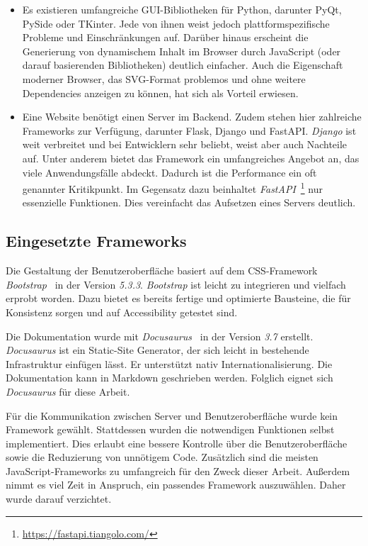 \begin{itemize}
    \item Es existieren umfangreiche GUI-Bibliotheken für Python, darunter PyQt, PySide oder TKinter. Jede von ihnen weist jedoch plattformspezifische Probleme und Einschränkungen auf.
    Darüber hinaus erscheint die Generierung von dynamischem Inhalt im Browser durch JavaScript (oder darauf basierenden Bibliotheken) deutlich einfacher. Auch die Eigenschaft moderner Browser,
    das SVG-Format problemos und ohne weitere Dependencies anzeigen zu können, hat sich als Vorteil erwiesen.
    \item Eine Website benötigt einen Server im Backend. Zudem stehen hier zahlreiche Frameworks zur Verfügung, darunter Flask, Django und FastAPI.
    \textit{Django} ist weit verbreitet und bei Entwicklern sehr beliebt, weist aber auch Nachteile auf. Unter anderem bietet das Framework ein umfangreiches Angebot an, das viele Anwendungsfälle abdeckt.
    Dadurch ist die Performance ein oft genannter Kritikpunkt. 
    Im Gegensatz dazu beinhaltet \textit{FastAPI}~\footnote{\hspace{1.5mm}\url{https://fastapi.tiangolo.com/}} nur essenzielle Funktionen. Dies vereinfacht das Aufsetzen eines Servers deutlich.
\end{itemize}

\subsection{Eingesetzte Frameworks}

Die Gestaltung der Benutzeroberfläche basiert auf dem CSS-Framework \textit{Bootstrap}~\cite{bootstrap} in der Version \textit{5.3.3}.
\textit{Bootstrap} ist leicht zu integrieren und vielfach erprobt worden. Dazu bietet es bereits fertige und optimierte Bausteine, die für Konsistenz sorgen und auf Accessibility getestet sind.

Die Dokumentation wurde mit \textit{Docusaurus}~\cite{docusaurus} in der Version \textit{3.7} erstellt. \textit{Docusaurus} ist ein Static-Site Generator, der sich leicht in
bestehende Infrastruktur einfügen lässt. Er unterstützt nativ Internationalisierung. Die Dokumentation kann in Markdown geschrieben werden. Folglich eignet sich \textit{Docusaurus} für diese Arbeit.

Für die Kommunikation zwischen Server und Benutzeroberfläche wurde kein Framework gewählt. Stattdessen wurden die notwendigen Funktionen selbst implementiert. Dies erlaubt eine bessere Kontrolle über die Benutzeroberfläche sowie die
Reduzierung von unnötigem Code. Zusätzlich sind die meisten JavaScript-Frameworks zu umfangreich für den Zweck dieser Arbeit. Außerdem nimmt es viel Zeit in Anspruch, ein passendes Framework auszuwählen. Daher wurde darauf verzichtet.

